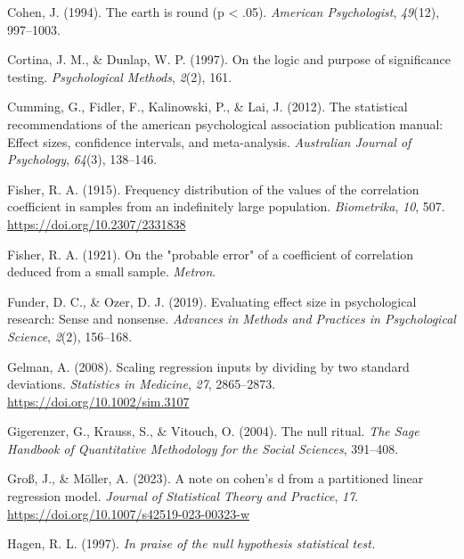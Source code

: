 \documentclass[
  man,floatsintext]{apa7}
\newlength{\cslhangindent}
\newlength{\cslentryspacingunit} %
\newenvironment{CSLReferences}[2] %
 {%
  \setlength{\parindent}{0pt}
  \ifodd #1
  \let\oldpar\par
  \def\par{\hangindent=\cslhangindent\oldpar}
  \fi
  \setlength{\parskip}{#2\cslentryspacingunit}
 }%
 {}
\begin{document}
\begin{CSLReferences}{1}{0}
\leavevmode{}%
Cohen, J. (1994). The earth is round (p \textless{} .05). \emph{American Psychologist}, \emph{49}(12), 997--1003.

\leavevmode{}%
Cortina, J. M., \& Dunlap, W. P. (1997). On the logic and purpose of significance testing. \emph{Psychological Methods}, \emph{2}(2), 161.

\leavevmode{}%
Cumming, G., Fidler, F., Kalinowski, P., \& Lai, J. (2012). The statistical recommendations of the american psychological association publication manual: Effect sizes, confidence intervals, and meta-analysis. \emph{Australian Journal of Psychology}, \emph{64}(3), 138--146.

\leavevmode{}%
Fisher, R. A. (1915). Frequency distribution of the values of the correlation coefficient in samples from an indefinitely large population. \emph{Biometrika}, \emph{10}, 507. \url{https://doi.org/10.2307/2331838}

\leavevmode{}%
Fisher, R. A. (1921). On the "probable error" of a coefficient of correlation deduced from a small sample. \emph{Metron}.

\leavevmode{}%
Funder, D. C., \& Ozer, D. J. (2019). Evaluating effect size in psychological research: Sense and nonsense. \emph{Advances in Methods and Practices in Psychological Science}, \emph{2}(2), 156--168.

\leavevmode{}%
Gelman, A. (2008). Scaling regression inputs by dividing by two standard deviations. \emph{Statistics in Medicine}, \emph{27}, 2865--2873. \url{https://doi.org/10.1002/sim.3107}

\leavevmode{}%
Gigerenzer, G., Krauss, S., \& Vitouch, O. (2004). The null ritual. \emph{The Sage Handbook of Quantitative Methodology for the Social Sciences}, 391--408.

\leavevmode{}%
Groß, J., \& Möller, A. (2023). A note on cohen's d from a partitioned linear regression model. \emph{Journal of Statistical Theory and Practice}, \emph{17}. \url{https://doi.org/10.1007/s42519-023-00323-w}

\leavevmode{}%
Hagen, R. L. (1997). \emph{In praise of the null hypothesis statistical test.}


\end{CSLReferences}
\end{document}
